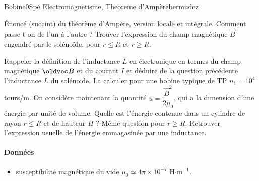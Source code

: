 \begin{exercise}{Bobine}{0}{Spé}
{Electromagnetisme, Theoreme d'Ampère}{bermudez}

\begin{questions}
    \questioncours Énoncé (succint) du théorème d'Ampère, version locale et intégrale. Comment passe-t-on de l'un à l'autre ?
    \question Trouver l'expression du champ magnétique $\vec{B}$ engendré par le solénoïde, pour $r \leq R$ et $r \geq R$.
    
    \question Rappeler la définition de l'inductance $L$ en électronique en termes du champ magnétique $\vB$ et du courant $I$ et déduire de la question précédente l'inductance $L$ du solénoide. La calculer pour une bobine typique de TP $n_\ell = 10^4$ tours/m.
    \question On considère maintenant la quantité $u = \dfrac{\vec{B}^2}{2\mu_0}$, qui a la dimension d'une énergie par unité de volume. Quelle est l'énergie contenue dans un cylindre de rayon $r \leq R$ et de hauteur $H$ ? Même question pour $r \geq R$.
    \question Retrouver l'expression usuelle de l'énergie emmagasinée par une inductance.
\end{questions}

\paragraph{Données}

\begin{itemize}
    \item susceptibilité magnétique du vide $\mu_0 \simeq 4\pi \times 10^{-7}$ H$\cdot\text{m}^{-1}$.
\end{itemize}

\end{exercise}

\newpage

